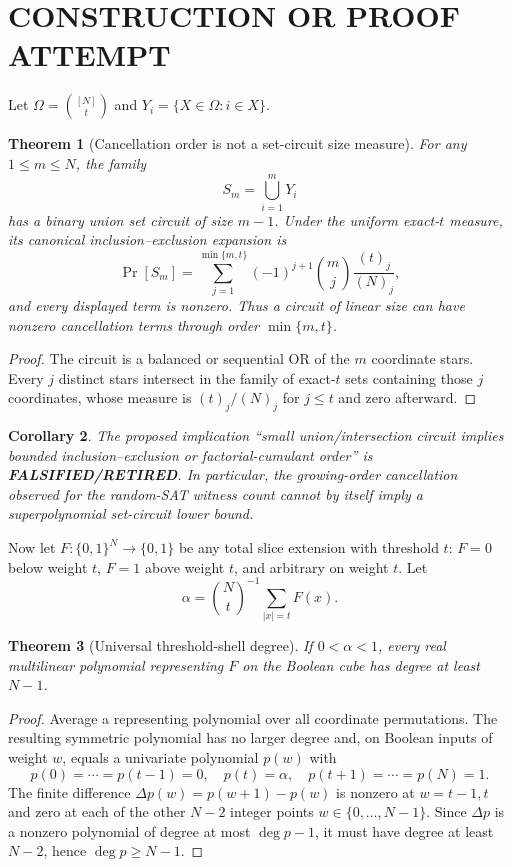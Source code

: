 \documentclass[11pt]{article}
\newtheorem{theorem}{Theorem}
\newtheorem{corollary}[theorem]{Corollary}
\begin{document}
\section{CONSTRUCTION OR PROOF ATTEMPT}
Let $\Omega=\binom{[N]}t$ and $Y_i=\{X\in\Omega:i\in X\}$.

\begin{theorem}[Cancellation order is not a set-circuit size measure]
For any $1\le m\le N$, the family
\[S_m=\bigcup_{i=1}^m Y_i\]
has a binary union set circuit of size $m-1$. Under the uniform exact-$t$ measure, its canonical inclusion--exclusion expansion is
\[\Pr[S_m]=\sum_{j=1}^{\min\{m,t\}}(-1)^{j+1}\binom mj\frac{(t)_j}{(N)_j},\]
and every displayed term is nonzero. Thus a circuit of linear size can have nonzero cancellation terms through order $\min\{m,t\}$.
\end{theorem}
\begin{proof}
The circuit is a balanced or sequential OR of the $m$ coordinate stars. Every $j$ distinct stars intersect in the family of exact-$t$ sets containing those $j$ coordinates, whose measure is $(t)_j/(N)_j$ for $j\le t$ and zero afterward.
\end{proof}

\begin{corollary}
The proposed implication ``small union/intersection circuit implies bounded inclusion--exclusion or factorial-cumulant order'' is \textbf{FALSIFIED/RETIRED}. In particular, the growing-order cancellation observed for the random-SAT witness count cannot by itself imply a superpolynomial set-circuit lower bound.
\end{corollary}

Now let $F:\{0,1\}^N\to\{0,1\}$ be any total slice extension with threshold $t$: $F=0$ below weight $t$, $F=1$ above weight $t$, and arbitrary on weight $t$. Let
\[\alpha=\binom Nt^{-1}\sum_{|x|=t}F(x).\]

\begin{theorem}[Universal threshold-shell degree]
If $0<\alpha<1$, every real multilinear polynomial representing $F$ on the Boolean cube has degree at least $N-1$.
\end{theorem}
\begin{proof}
Average a representing polynomial over all coordinate permutations. The resulting symmetric polynomial has no larger degree and, on Boolean inputs of weight $w$, equals a univariate polynomial $p(w)$ with
\[p(0)=\cdots=p(t-1)=0,\quad p(t)=\alpha,\quad p(t+1)=\cdots=p(N)=1.\]
The finite difference $\Delta p(w)=p(w+1)-p(w)$ is nonzero at $w=t-1,t$ and zero at each of the other $N-2$ integer points $w\in\{0,\ldots,N-1\}$. Since $\Delta p$ is a nonzero polynomial of degree at most $\deg p-1$, it must have degree at least $N-2$, hence $\deg p\ge N-1$.
\end{proof}
\end{document}
